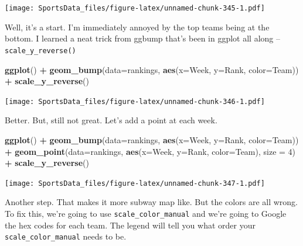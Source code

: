 \documentclass[]{book}
\newenvironment{Shaded}{\begin{snugshade}}{\end{snugshade}}
\newcommand{\DataTypeTok}[1]{\textcolor[rgb]{0.13,0.29,0.53}{#1}}
\newcommand{\DecValTok}[1]{\textcolor[rgb]{0.00,0.00,0.81}{#1}}
\newcommand{\KeywordTok}[1]{\textcolor[rgb]{0.13,0.29,0.53}{\textbf{#1}}}
\newcommand{\NormalTok}[1]{#1}
\newcommand{\OperatorTok}[1]{\textcolor[rgb]{0.81,0.36,0.00}{\textbf{#1}}}
\newcommand{\StringTok}[1]{\textcolor[rgb]{0.31,0.60,0.02}{#1}}
\begin{document}
\texttt{[image: SportsData\_files/figure-latex/unnamed-chunk-345-1.pdf]}

Well, it's a start. I'm immediately annoyed by the top teams being at the bottom. I learned a neat trick from ggbump that's been in ggplot all along -- \texttt{scale\_y\_reverse()}

\begin{Shaded}
\begin{Highlighting}[]
\KeywordTok{ggplot}\NormalTok{() }\OperatorTok{+}\StringTok{ }\KeywordTok{geom_bump}\NormalTok{(}\DataTypeTok{data=}\NormalTok{rankings, }\KeywordTok{aes}\NormalTok{(}\DataTypeTok{x=}\NormalTok{Week, }\DataTypeTok{y=}\NormalTok{Rank, }\DataTypeTok{color=}\NormalTok{Team)) }\OperatorTok{+}\StringTok{ }\KeywordTok{scale_y_reverse}\NormalTok{()}
\end{Highlighting}
\end{Shaded}

\texttt{[image: SportsData\_files/figure-latex/unnamed-chunk-346-1.pdf]}

Better. But, still not great. Let's add a point at each week.

\begin{Shaded}
\begin{Highlighting}[]
\KeywordTok{ggplot}\NormalTok{() }\OperatorTok{+}\StringTok{ }
\StringTok{  }\KeywordTok{geom_bump}\NormalTok{(}\DataTypeTok{data=}\NormalTok{rankings, }\KeywordTok{aes}\NormalTok{(}\DataTypeTok{x=}\NormalTok{Week, }\DataTypeTok{y=}\NormalTok{Rank, }\DataTypeTok{color=}\NormalTok{Team)) }\OperatorTok{+}\StringTok{ }
\StringTok{  }\KeywordTok{geom_point}\NormalTok{(}\DataTypeTok{data=}\NormalTok{rankings, }\KeywordTok{aes}\NormalTok{(}\DataTypeTok{x=}\NormalTok{Week, }\DataTypeTok{y=}\NormalTok{Rank, }\DataTypeTok{color=}\NormalTok{Team), }\DataTypeTok{size =} \DecValTok{4}\NormalTok{) }\OperatorTok{+}
\StringTok{  }\KeywordTok{scale_y_reverse}\NormalTok{() }
\end{Highlighting}
\end{Shaded}

\texttt{[image: SportsData\_files/figure-latex/unnamed-chunk-347-1.pdf]}

Another step. That makes it more subway map like. But the colors are all wrong. To fix this, we're going to use \texttt{scale\_color\_manual} and we're going to Google the hex codes for each team. The legend will tell you what order your \texttt{scale\_color\_manual} needs to be.
\end{document}
